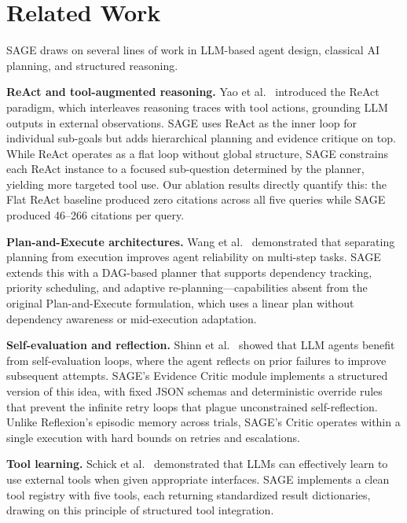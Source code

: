\documentclass[11pt]{article}
\begin{document}
\section{Related Work}

SAGE draws on several lines of work in LLM-based agent design, classical AI planning, and structured reasoning.

\textbf{ReAct and tool-augmented reasoning.}
Yao et al.~\cite{yao2023react} introduced the ReAct paradigm, which interleaves reasoning traces with tool actions, grounding LLM outputs in external observations. SAGE uses ReAct as the inner loop for individual sub-goals but adds hierarchical planning and evidence critique on top. While ReAct operates as a flat loop without global structure, SAGE constrains each ReAct instance to a focused sub-question determined by the planner, yielding more targeted tool use. Our ablation results directly quantify this: the Flat ReAct baseline produced zero citations across all five queries while SAGE produced 46--266 citations per query.

\textbf{Plan-and-Execute architectures.}
Wang et al.~\cite{wang2023plan} demonstrated that separating planning from execution improves agent reliability on multi-step tasks. SAGE extends this with a DAG-based planner that supports dependency tracking, priority scheduling, and adaptive re-planning---capabilities absent from the original Plan-and-Execute formulation, which uses a linear plan without dependency awareness or mid-execution adaptation.

\textbf{Self-evaluation and reflection.}
Shinn et al.~\cite{shinn2023reflexion} showed that LLM agents benefit from self-evaluation loops, where the agent reflects on prior failures to improve subsequent attempts. SAGE's Evidence Critic module implements a structured version of this idea, with fixed JSON schemas and deterministic override rules that prevent the infinite retry loops that plague unconstrained self-reflection. Unlike Reflexion's episodic memory across trials, SAGE's Critic operates within a single execution with hard bounds on retries and escalations.

\textbf{Tool learning.}
Schick et al.~\cite{schick2023toolformer} demonstrated that LLMs can effectively learn to use external tools when given appropriate interfaces. SAGE implements a clean tool registry with five tools, each returning standardized result dictionaries, drawing on this principle of structured tool integration.
\end{document}
